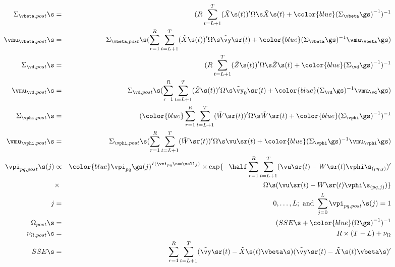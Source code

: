 \begin{eqnarray}
\Sigma_{\vbeta,post}\s&=& (R\sum_{t=L+1}^{T}(\tilde{X}\s(t))'\Omega\s\tilde{X}\s(t)+{\color{blue}(\Sigma_{\vbeta}\gs)}^{-1})^{-1} \\
\vmu_{\vbeta,post}\s &=& \Sigma_{\vbeta,post}\s(\sum_{r=1}^{R}\sum_{t=L+1}^{T}(\tilde{X}\s(t))'\Omega\s\tilde{\vy}\sr(t)+{\color{blue}(\Sigma_{\vbeta}\gs)^{-1}\vmu_{\vbeta}\gs})\\
\Sigma_{\vd,post}\s&=& (R\sum_{t=L+1}^{T}(\tilde{Z}\s(t))'\Omega\s\tilde{Z}\s(t)+{\color{blue}(\Sigma_{\vd}\gs)}^{-1})^{-1} \\
\vmu_{\vd,post}\s &=& \Sigma_{\vd,post}\s(\sum_{r=1}^{R}\sum_{t=L+1}^{T}(\tilde{Z}\s(t))'\Omega\s\tilde{\vy}_0\sr(t)+{\color{blue}(\Sigma_{\vd}\gs)^{-1} \vmu_{\vd}\gs})\\
\Sigma_{\vphi,post}\s&=& ({\color{blue}\sum_{r=1}^R}\sum_{t=L+1}^{T}(\tilde{W}\sr(t))'\Omega\s\tilde{W}\sr(t)+ {\color{blue}(\Sigma_{\vphi}\gs)}^{-1})^{-1} \\
\vmu_{\vphi,post}\s &=& \Sigma_{\vphi,post}\s(\sum_{r=1}^{R}\sum_{t=L+1}^{T}(\tilde{W}\sr(t))'\Omega\s\vu\sr(t)+ {\color{blue}(\Sigma_{\vphi}\gs)^{-1} \vmu_{\vphi}\gs})\\
\vpi_{pq, post}\s(j) &\propto& {\color{blue}\vpi_{pq}\gs(j)}^{I(\vxi_{pq}\s=\vell_j)}\times \exp\{ -\half\sum_{r=1}^{R}\sum_{t=L+1}^{T}(\vu\sr(t)-W\sr(t)\vphi\s_{(pq,j)})' \\
&\times&\Omega\s(\vu\sr(t)-W\sr(t)\vphi\s_{(pq,j)})\}\\
j&=&0,\dots, L; ~\text{and } \sum_{j=0}^L \vpi_{pq, post}\s(j) = 1 \\%
\Omega_{post}\s&=& (SSE\s + {\color{blue}(\Omega\gs)}^{-1})^{-1}\\
\nu_{\Omega,post}\s&=& R\times(T - L) +\nu_{\Omega}\\
\label{SSE}
SSE\s &=& \sum_{r=1}^{R}\sum_{t=L+1}^{T}(\tilde{\vy}\sr(t) - \tilde{X}\s(t)\vbeta\s)(\tilde{\vy}\sr(t) - \tilde{X}\s(t)\vbeta\s)' 
\end{eqnarray}

